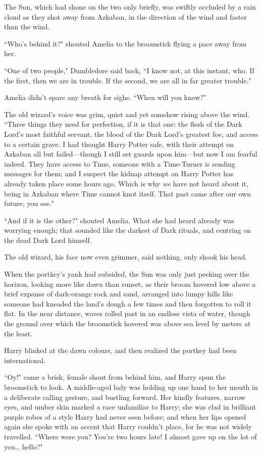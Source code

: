 \later

The Sun, which had shone on the two only briefly, was swiftly occluded by a rain cloud as they shot away from Azkaban, in the direction of the wind and faster than the wind.

``Who's behind it?" shouted Amelia to the broomstick flying a pace away from her.

``One of two people," Dumbledore said back, ``I know not, at this instant, who. If the first, then we are in trouble. If the second, we are all in far greater trouble."

Amelia didn't spare any breath for sighs. ``When will you know?"

The old wizard's voice was grim, quiet and yet somehow rising above the wind. ``Three things they need for perfection, if it is that one: the flesh of the Dark Lord's most faithful servant, the blood of the Dark Lord's greatest foe, and access to a certain grave. I had thought Harry Potter safe, with their attempt on Azkaban all but failed—though I still set guards upon him—but now I am fearful indeed. They have access to Time, someone with a Time-Turner is sending messages for them; and I suspect the kidnap attempt on Harry Potter has already taken place some hours ago. Which is why \emph{we} have not heard about it, being in Azkaban where Time cannot knot itself. That past came after our own future, you see."

``And if it is the other?" shouted Amelia. What she had heard already was worrying enough; that sounded like the darkest of Dark rituals, and centring on the dead Dark Lord himself.

The old wizard, his face now even grimmer, said nothing, only shook his head.

\later

When the portkey's yank had subsided, the Sun was only just peeking over the horizon, looking more like dawn than sunset, as their broom hovered low above a brief expanse of dark-orange rock and sand, arranged into lumpy hills like someone had kneaded the land's dough a few times and then forgotten to roll it flat. In the near distance, waves rolled past in an endless vista of water, though the ground over which the broomstick hovered was above sea level by meters at the least.

Harry blinked at the dawn colours, and then realized the portkey had been international.

``Oy!" came a brisk, female shout from behind him, and Harry spun the broomstick to look. A middle-aged lady was holding up one hand to her mouth in a deliberate calling gesture, and bustling forward. Her kindly features, narrow eyes, and umber skin marked a race unfamiliar to Harry; she was clad in brilliant purple robes of a style Harry had never seen before; and when her lips opened again she spoke with an accent that Harry couldn't place, for he was not widely travelled. ``Where were you? You're two hours late! I almost gave up on the lot of you{\ldots} hello?"

